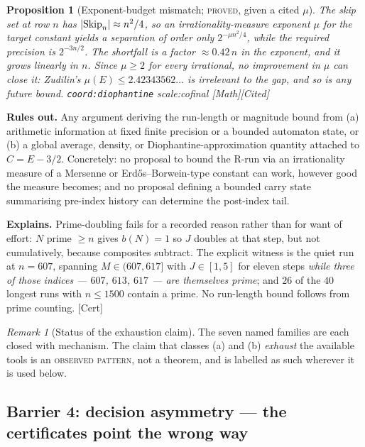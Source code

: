 \documentclass[11pt]{article}
\theoremstyle{plain}
\newtheorem{prop}[thm]{Proposition}
\theoremstyle{definition}
\theoremstyle{remark}
\newtheorem{rem}[thm]{Remark}
\let\origmathrm\mathrm
\renewcommand{\mathrm}[1]{\ifmmode\origmathrm{#1}\else\textrm{#1}\fi}%
\newcommand{\ev}[1]{{\small\textsf{[#1]}}\xspace}
\newcommand{\scale}[1]{{\small\textsf{scale:#1}}\xspace}
\newcommand{\coord}[1]{\texorpdfstring{{\small\nolinkurl{coord:#1}}}{coord:#1}\xspace}
\begin{document}
\begin{prop}[Exponent-budget mismatch; \textsc{proved}, given a cited $\mu$]
\label{prop:exponent-gap}
The skip set at row $n$ has $|\mathrm{Skip}_n| \approx n^2/4$, so an irrationality-measure exponent
$\mu$ for the target constant yields a separation of order only $2^{-\mu n^2/4}$, while the
required precision is $2^{-3n/2}$. The shortfall is a factor $\approx 0.42\,n$ \emph{in the
exponent}, and it grows linearly in $n$. Since $\mu \ge 2$ for every irrational, no improvement in
$\mu$ can close it: Zudilin's $\mu(E) \le 2.42343562\ldots$ is irrelevant to the gap, and so is any
future bound. \coord{diophantine} \scale{cofinal} \ev{Math}\ev{Cited}
\end{prop}

\textbf{Rules out.} Any argument deriving the run-length or magnitude bound from (a) arithmetic
information at fixed finite precision or a bounded automaton state, or (b) a global average,
density, or Diophantine-approximation quantity attached to $C = E - 3/2$. Concretely: no proposal
to bound the R-run via an irrationality measure of a Mersenne or Erd\H{o}s--Borwein-type constant
can work, however good the measure becomes; and no proposal defining a bounded carry state
summarising pre-index history can determine the post-index tail.

\textbf{Explains.} Prime-doubling fails for a recorded reason rather than for want of effort: $N$
prime $\ge n$ gives $b(N) = 1$ so $J$ doubles at that step, but not cumulatively, because
composites subtract. The explicit witness is the quiet run at $n = 607$, spanning
$M \in (607,617]$ with $J \in [1,5]$ for eleven steps \emph{while three of those indices --- $607$,
$613$, $617$ --- are themselves prime}; and $26$ of the $40$ longest runs with $n \le 1500$ contain
a prime. No run-length bound follows from prime counting. \ev{Cert}

\begin{rem}[Status of the exhaustion claim]
The seven named families are each closed with mechanism. The claim that classes (a) and (b)
\emph{exhaust} the available tools is an \textsc{observed pattern}, not a theorem, and is labelled
as such wherever it is used below.
\end{rem}

\subsection{Barrier 4: decision asymmetry --- the certificates point the wrong way}
\label{bar:asym}
\end{document}
